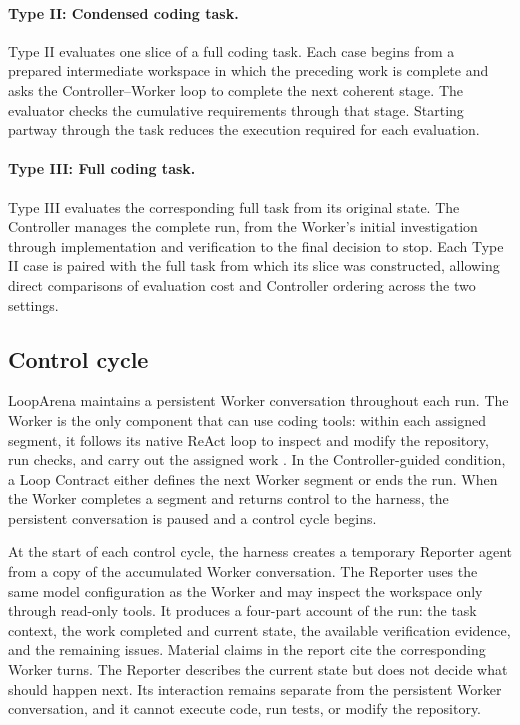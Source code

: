 \paragraph{Type II: Condensed coding task.} Type II evaluates one slice of a full coding task. Each case begins from a prepared intermediate workspace in which the preceding work is complete and asks the Controller--Worker loop to complete the next coherent stage. The evaluator checks the cumulative requirements through that stage. Starting partway through the task reduces the execution required for each evaluation.

\paragraph{Type III: Full coding task.} Type III evaluates the corresponding full task from its original state. The Controller manages the complete run, from the Worker's initial investigation through implementation and verification to the final decision to stop. Each Type II case is paired with the full task from which its slice was constructed, allowing direct comparisons of evaluation cost and Controller ordering across the two settings.

\subsection{Control cycle}
\label{sec:control-cycle}

LoopArena maintains a persistent Worker conversation throughout each run. The Worker is the only component that can use coding tools: within each assigned segment, it follows its native ReAct loop to inspect and modify the repository, run checks, and carry out the assigned work \citep{ReAct2022,CodeAct2024}. In the Controller-guided condition, a Loop Contract either defines the next Worker segment or ends the run. When the Worker completes a segment and returns control to the harness, the persistent conversation is paused and a control cycle begins.

At the start of each control cycle, the harness creates a temporary Reporter agent from a copy of the accumulated Worker conversation. The Reporter uses the same model configuration as the Worker and may inspect the workspace only through read-only tools. It produces a four-part account of the run: the task context, the work completed and current state, the available verification evidence, and the remaining issues. Material claims in the report cite the corresponding Worker turns. The Reporter describes the current state but does not decide what should happen next. Its interaction remains separate from the persistent Worker conversation, and it cannot execute code, run tests, or modify the repository.

